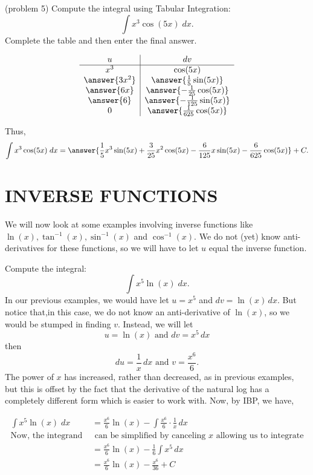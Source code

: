 \documentclass{ximera}
\begin{document}
\begin{problem}(problem 5)
Compute the integral using Tabular Integration:
  \[
  \int x^3 \cos(5x) \;dx.
  \]
Complete the table and then enter the final answer.
\begin{center}
\[
\begin{array}{c|c}
		u & dv  \\\hline 
		x^3 & \cos(5x) \\ 
     \answer{3x^2} & \answer{\frac15 \sin(5x)} \\ 
      \answer{6x} & \answer{-\frac{1}{25} \cos(5x)} \\ 
       \answer{6} & \answer{-\frac{1}{125} \sin(5x)} \\
       0 & \answer{\frac{1}{625} \cos(5x)} 
	\end{array}
    \]
\end{center}



Thus,
\[
  \int x^3 \cos(5x) \;dx = \answer{\frac15 x^3\sin(5x) + \frac{3}{25}x^2 \cos(5x) - \frac{6}{125}x\sin(5x) -\frac{6}{625}\cos(5x)} +C.
  \]
\end{problem}



\section{INVERSE FUNCTIONS}

We will now look at some examples involving inverse functions like $\ln(x), \tan^{-1}(x), \sin^{-1}(x)$ and $\cos^{-1}(x)$.
We do not (yet) know anti-derivatives for these functions, so we will have to let $u$ equal the inverse function.
 
\begin{example}[example 6]
Compute the integral:
  \[
  \int x^5\ln(x) \;dx.
  \]
In our previous examples, we would have let $u = x^5$ and $dv = \ln(x) \, dx$.
But notice that,in this case, we do not know an anti-derivative of $\ln(x)$, so 
we would be stumped in finding $v$. Instead, we will let 
\[
u = \ln(x)  \text{  and  } dv = x^5 \, dx\]
then
\[
du = \frac{1}{x} \, dx \text{  and  } v = \frac{x^6}{6}.
\]
The power of $x$ has increased, rather than decreased, as in previous examples, but this 
is offset by the fact that the derivative of the natural log has a completely different form
which is easier to work with. Now, by IBP, we have,

\begin{align*}
  \int x^5\ln(x) \;dx &= \frac{x^6}{6}\ln(x) - \int \frac{x^6}{6}\cdot \frac{1}{x} \, dx\\
\text{Now, the integrand } & \text{ can be simplified by canceling $x$ allowing us to integrate}\\
&= \frac{x^6}{6}\ln(x) - \frac16\int x^5 \, dx\\
&= \frac{x^6}{6}\ln(x) -  \frac{x^6}{36} + C\\
\end{align*}

\end{example}
\end{document}
